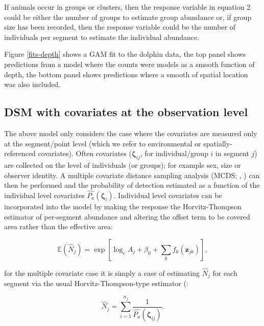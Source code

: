 \documentclass[a4paper,12pt]{article}
\begin{document}
If animals occur in groups or clusters, then the response variable in equation 2 could be either the number of groups to estimate group abundance or, if group size has been recorded, then the response variable could be the number of individuals per segment to estimate the individual abundance.


Figure \ref{fits-depth} shows a GAM fit to the dolphin data, the top panel shows predictions from a model where the counts were models as a smooth function of depth, the bottom panel shows predictions where a smooth of spatial location was also included.

\subsection*{DSM with covariates at the observation level}

The above model only considers the case where the covariates are measured only at the segment/point level (which we refer to environmental or spatially-referenced covariates). Often covariates ($\bm{\zeta}_{ij}$, for individual/group $i$ in segment $j$) are collected on the level of individuals (or groups); for example sex, size or observer identity. A multiple covariate distance sampling analysis (MCDS; \cite{Marques:2003vb}, \cite{Marques:2007vm}) can then be performed and the probability of detection estimated as a function of the individual level covariates $\hat{P_a}(\bm{\zeta}_i)$. Individual level covariates can be incorporated into the model by making the response the Horvitz-Thompson estimator of per-segment abundance and altering the offset term to be covered area rather than the effective area:

\begin{equation}
\mathbb{E}(\hat{N}_j) = \exp\left[ \log_e A_j + \beta_0 + \sum_k f_k\left(\bm{z}_{jk}\right) \right],
\label{e:gamN}
\end{equation}

for the multiple covariate case it is simply a case of estimating $\hat{N}_j$ for each segment via the usual Horvitz-Thompson-type estimator (\cite{Thompson:2002wi}:

\begin{equation*}
\hat{N}_j = \sum_{i=1}^{n_j} \frac{1}{\hat{P_a}(\bm{\zeta}_{ij})}.
\end{equation*}
\end{document}
